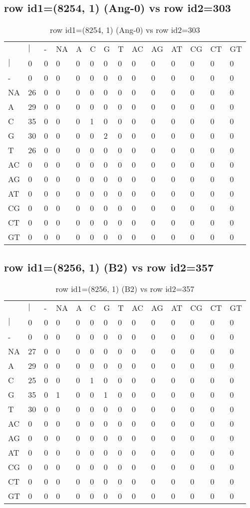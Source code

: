 \subsection{row id1=(8254, 1) (Ang-0) vs row id2=303}
\begin{center}
\begin{longtable}{|l|l|l|l|l|l|l|l|l|l|l|l|l|l|}
\caption{row id1=(8254, 1) (Ang-0) vs row id2=303} \label{table_dm396}\\
\hline
\\
\hline
&$|$&-&NA&A&C&G&T&AC&AG&AT&CG&CT&GT\\
$|$&0&0&0&0&0&0&0&0&0&0&0&0&0\\
-&0&0&0&0&0&0&0&0&0&0&0&0&0\\
NA&26&0&0&0&0&0&0&0&0&0&0&0&0\\
A&29&0&0&0&0&0&0&0&0&0&0&0&0\\
C&35&0&0&0&1&0&0&0&0&0&0&0&0\\
G&30&0&0&0&0&2&0&0&0&0&0&0&0\\
T&26&0&0&0&0&0&0&0&0&0&0&0&0\\
AC&0&0&0&0&0&0&0&0&0&0&0&0&0\\
AG&0&0&0&0&0&0&0&0&0&0&0&0&0\\
AT&0&0&0&0&0&0&0&0&0&0&0&0&0\\
CG&0&0&0&0&0&0&0&0&0&0&0&0&0\\
CT&0&0&0&0&0&0&0&0&0&0&0&0&0\\
GT&0&0&0&0&0&0&0&0&0&0&0&0&0\\
\hline
\end{longtable}
\end{center}

\subsection{row id1=(8256, 1) (B2) vs row id2=357}
\begin{center}
\begin{longtable}{|l|l|l|l|l|l|l|l|l|l|l|l|l|l|}
\caption{row id1=(8256, 1) (B2) vs row id2=357} \label{table_dm398}\\
\hline
\\
\hline
&$|$&-&NA&A&C&G&T&AC&AG&AT&CG&CT&GT\\
$|$&0&0&0&0&0&0&0&0&0&0&0&0&0\\
-&0&0&0&0&0&0&0&0&0&0&0&0&0\\
NA&27&0&0&0&0&0&0&0&0&0&0&0&0\\
A&29&0&0&0&0&0&0&0&0&0&0&0&0\\
C&25&0&0&0&1&0&0&0&0&0&0&0&0\\
G&35&0&1&0&0&1&0&0&0&0&0&0&0\\
T&30&0&0&0&0&0&0&0&0&0&0&0&0\\
AC&0&0&0&0&0&0&0&0&0&0&0&0&0\\
AG&0&0&0&0&0&0&0&0&0&0&0&0&0\\
AT&0&0&0&0&0&0&0&0&0&0&0&0&0\\
CG&0&0&0&0&0&0&0&0&0&0&0&0&0\\
CT&0&0&0&0&0&0&0&0&0&0&0&0&0\\
GT&0&0&0&0&0&0&0&0&0&0&0&0&0\\
\hline
\end{longtable}
\end{center}

